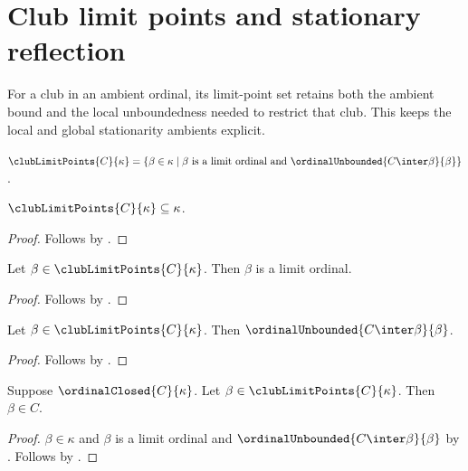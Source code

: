 \section{Club limit points and stationary reflection}



For a club in an ambient ordinal, its limit-point set retains both the
ambient bound and the local unboundedness needed to restrict that club.  This
keeps the local and global stationarity ambients explicit.

\begin{definition}\label{club_limit_points}
    $\clubLimitPoints{C}{\kappa}
        =\{\beta\in\kappa\mid
            \text{$\beta$ is a limit ordinal and
                $\ordinalUnbounded{C\inter\beta}{\beta}$}\}$.
\end{definition}

\begin{proposition}\label{club_limit_points_subset}
    $\clubLimitPoints{C}{\kappa}\subseteq\kappa$.
\end{proposition}
\begin{proof}
    Follows by .
\end{proof}

\begin{proposition}\label{club_limit_point_is_limit}
    Let $\beta\in\clubLimitPoints{C}{\kappa}$.
    Then $\beta$ is a limit ordinal.
\end{proposition}
\begin{proof}
    Follows by .
\end{proof}

\begin{proposition}\label{club_limit_point_unbounded_restriction}
    Let $\beta\in\clubLimitPoints{C}{\kappa}$.
    Then $\ordinalUnbounded{C\inter\beta}{\beta}$.
\end{proposition}
\begin{proof}
    Follows by .
\end{proof}

\begin{proposition}\label{club_limit_point_of_closed_set_mem}
    Suppose $\ordinalClosed{C}{\kappa}$.
    Let $\beta\in\clubLimitPoints{C}{\kappa}$.
    Then $\beta\in C$.
\end{proposition}
\begin{proof}
    $\beta\in\kappa$ and $\beta$ is a limit ordinal and
        $\ordinalUnbounded{C\inter\beta}{\beta}$
        by .
    Follows by .
\end{proof}

